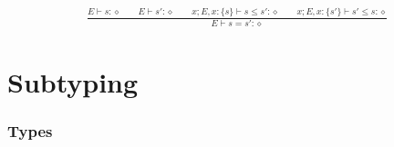 \documentclass[twoside]{article}
\newcommand{\void}[1]{}
\newcommand{\f}[1]{\mbox{#1}}
\begin{document}
\begin{displaymath}
\begin{array}{c}
\displaystyle
\frac{
E \vdash s : \diamond
\qquad
E \vdash s' : \diamond
\qquad
x;E,x:\{s\} \vdash s \leq s' : \diamond
\qquad
x;E,x:\{s'\} \vdash s' \leq s : \diamond
}{
E \vdash s = s' : \diamond
}
\void{
\frac{
E \vdash s : \diamond
}{
E \vdash s = s : \diamond
}
\qquad
\frac{
E \vdash s' = s : \diamond
}{
E \vdash s = s' : \diamond
}
\qquad
\frac{
E \vdash s = s'' : \diamond
\qquad
E \vdash s'' = s' : \diamond
}{
E \vdash s = s' : \diamond
}
\\\\\displaystyle
\frac{
E \vdash t = t' : \Omega
\qquad
E,x:t \vdash s = s' : \diamond
}{
E \vdash (ax:t;s) = (ax:t';s') : \diamond
}
\qquad
\frac{
E \vdash k = k' : \diamond
\qquad
E,x:k \vdash s = s' : \diamond
}{
E \vdash (ax:k;s) = (ax:k';s') : \diamond
}
\\\\\displaystyle
\frac{
E \vdash i = i' : \Omega
\qquad
E,x:i \vdash s = s' : \diamond
}{
E \vdash (ax:i;s) = (ax:i';s') : \diamond
}
\qquad
\frac{
E \vdash u = u' : \diamond
\qquad
E,x:u \vdash s = s' : \diamond
}{
E \vdash (ax:u;s) = (ax:u';s') : \diamond
}
\\\\\displaystyle
\frac{
E \vdash Z_1 : \Box
\qquad
E \vdash Z_2 : \Box
\qquad
E,x_1:Z_1,x_2:Z_2 \vdash s : \diamond
}{
E \vdash (a_1x_1:Z_1;a_2x_2:Z_2;s) = (a_2x_2:Z_2;a_1x_1:Z_1;s) : \diamond
}\left(
\begin{array}{@{}c@{}}
x_1 \notin \f{FV}(Z_2) \\
x_2 \notin \f{FV}(Z_1)
\end{array}
\right)
\\\\\displaystyle
\frac{
E \vdash (x:Z;s) : \diamond
}{
E \vdash (x:Z;s) = s : \diamond
}(x \notin \f{FV}(s))
}
\end{array}
\end{displaymath}



\section{Subtyping}
\label{subtyping}

\subsubsection*{Types \hfill
{}
}
\end{document}
